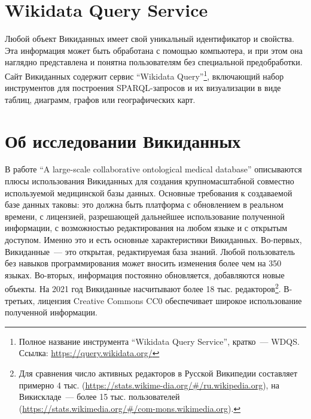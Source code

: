 \section{Wikidata Query Service}
\label{sect:WDQS}

Любой объект Викиданных имеет свой уникальный идентификатор и свойства. Эта информация может быть обработана с помощью компьютера, и при этом она наглядно представлена и понятна пользователям без специальной предобработки. Сайт Викиданных содержит сервис ``Wikidata Query''\footnote{Полное название инструмента ``Wikidata Query Service'', кратко~--- WDQS. Ссылка: \href{https://query.wikidata.org/}{https://query.wikidata.org/}}, включающий набор инструментов для построения SPARQL-запросов и их визуализации в виде таблиц, диаграмм, графов или географических карт.

\section{Об исследовании Викиданных}

В работе ``A large-scale collaborative ontological medical database''\autocite{Collaborative_ontological_database} 
описываются плюсы использования Викиданных для создания крупномасштабной 
совместно используемой медицинской базы данных. 
Основные требования к создаваемой базе данных таковы: 
это должна быть платформа с обновлением в реальном времени, 
с лицензией, разрешающей дальнейшее использование полученной информации, 
с возможностью редактирования на любом языке и с открытым доступом. 
Именно это и есть основные характеристики Викиданных. 
Во-первых, Викиданные~--- это открытая, редактируемая база знаний. 
Любой пользователь без навыков программирования может вносить изменения 
более чем на 350 языках. 
Во-вторых, информация постоянно обновляется, добавляются новые объекты. 
На 2021 год Викиданные насчитывают более 18 тыс. редакторов\footnote{Для сравнения число активных редакторов в Русской Википедии 
составляет примерно 4 тыс.  
(\href{https://stats.wikimedia.org/\#/ru.wikipedia.org}{https://stats.wikime-dia.org/\#/ru.wikipedia.org}), 
на Викискладе~--- более 15 тыс. пользователей 
(\href{https://stats.wikimedia.org/\#/commons.wikimedia.org}{https://stats.wikimedia.org/\#/com-mons.wikimedia.org}).}.
В-третьих, лицензия Creative Commons CC0 обеспечивает широкое использование полученной информации. 

